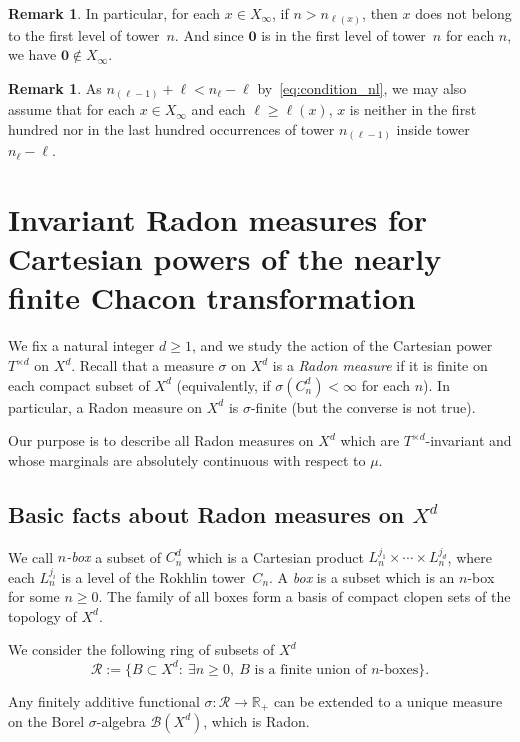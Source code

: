 \documentclass[10pt]{amsart}
\theoremstyle{definition}\newtheorem{defi}[theo]{Definition}\newtheorem{rema}[theo]{Remark}\newtheorem{exam}[theo]{Example}\newtheorem{exem}[theo]{Example}\newtheorem{nota}[theo]{Notation}
\newcommand{\egdef}{:=}
\newcommand{\RR}{\mathbb{R}}
\newcommand{\B}{\mathscr{B}}
\newcommand{\cd}{C^{d}}
\newcommand{\td}{T^{\times d}}
\newcommand{\bz}{\boldsymbol{0}}
\let\oldexists\exists
\renewcommand*{\exists}{\mathrel{\oldexists}}
\begin{document}
\begin{rema}\label{remark:first_level}
In particular, for each $x\in X_\infty$, if $n>n_{\ell(x)}$, then $x$ does not belong to the first level of tower~$n$. And since $\bz$ is in the first level of tower~$n$ for each $n$, we have $\bz\notin X_\infty$.
\end{rema}

\begin{rema}\label{remark:1.6}
As $n_{(\ell-1)}+\ell < n_\ell-\ell$ by~\eqref{eq:condition_nl}, we may also assume that for each $x\in X_\infty$ and each $\ell\ge \ell(x)$, $x$ is neither in the first hundred nor in the last hundred occurrences of tower $n_{(\ell-1)}$ inside tower $n_\ell-\ell$.
\end{rema}


\section{Invariant Radon measures for Cartesian powers of the nearly finite Chacon transformation}\label{sec:invariantmeasures}

We fix a natural integer $d\ge1$, and we study the action of the Cartesian power $\td$ on $X^d$. Recall that a measure $\sigma$ on $X^d$ is a \emph{Radon measure} if it is finite on each compact subset of $X^d$ (equivalently, if $\sigma(\cd_n)<\infty$ for each $n$). In particular, a Radon measure on $X^d$ is $\sigma$-finite (but the converse is not true).

Our purpose is to describe all Radon measures on $X^d$ which are $\td$-invariant and whose marginals are absolutely continuous with respect to $\mu$.

\subsection{Basic facts about Radon measures on \texorpdfstring{$X^d$}{Xd}}\label{sec:basicradon}

We call \emph{$n$-box} a subset of $\cd_n$ which is a Cartesian product $L_n^{j_1}\times \cdots\times L_n^{j_d}$, where each $L_n^{j_i}$ is a level of the Rokhlin tower~$C_n$. A \emph{box} is a subset which is an $n$-box for some $n\ge0$. The family of all boxes form a basis of compact clopen sets of the topology of $X^d$.

We consider the following ring of subsets of $X^d$
\[
\mathscr{R}\egdef\{B\subset X^d:\ \exists n\ge0,\ B\text{ is a finite union of $n$-boxes}\}.
\]

\begin{prop}\label{prop:caratheodory-extension}
Any finitely additive functional $\sigma:\mathscr{R}\to\RR_+$ can be extended to a unique measure on the Borel $\sigma$-algebra $\B(X^d)$, which is Radon.
\end{prop}
\end{document}
